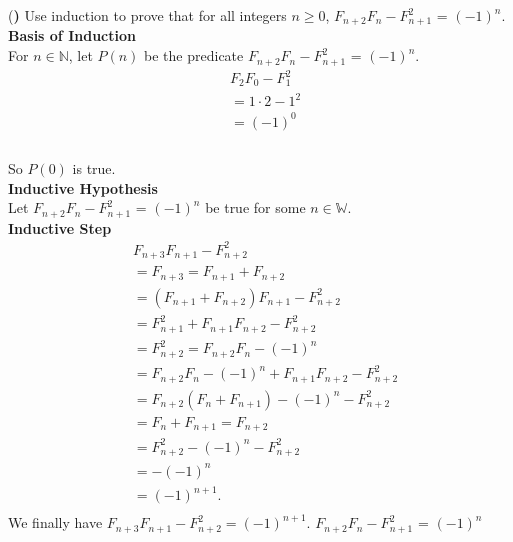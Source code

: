 \documentclass[12pt]{article}
\newcounter{problemnum}
\newcommand{\newprob}{\addtocounter{problemnum}{1} \noindent (\textbf{\arabic{problemnum}) }}
\begin{document}
\newprob Use induction to prove that for all integers $n \geq 0$, $F_{n+2}F_n-F^2_{n+1}$ = $(-1)^n$.\\
\textbf{Basis of Induction}\\
For $n \in \mathbb{N}$, let $P(n)$ be the predicate $F_{n+2}F_n-F^2_{n+1}$ = $(-1)^n$.\\

\begin{align*}
&F_2F_0-F^2_1\\
&=1 \cdot 2-1^2\\
&=(-1)^0\\
\end{align*}\\
So $P(0)$ is true.\\
\textbf{Inductive Hypothesis}\\
Let  $F_{n+2}F_n-F^2_{n+1}$ = $(-1)^n$ be true for some $n \in \mathbb{W}$.\\
\textbf{Inductive Step}\\
\begin{align*}
&F_{n+3}F_{n+1}-F^2_{n+2}\\
&=F_{n+3}=F_{n+1}+F_{n+2}\\
&=(F_{n+1}+F_{n+2})F_{n+1}-F^2_{n+2}\\
&=F^2_{n+1}+F_{n+1}F_{n+2}-F^2_{n+2}\\
&=F^2_{n+2} = F_{n+2}F_n-(-1)^n\\
&=F_{n+2}F_n-(-1)^n+F_{n+1}F_{n+2}-F^2_{n+2}\\
&=F_{n+2}(F_n+F_{n+1})-(-1)^n-F^2_{n+2}\\
&=F_n+F_{n+1}=F_{n+2}\\
&=F^2_{n+2}-(-1)^n-F^2_{n+2}\\
&=-(-1)^n\\
&=(-1)^{n+1}.\\
\end{align*}
We finally have $F_{n+3}F_{n+1}-F^2_{n+2}=(-1)^{n+1}.$
\therefore $F_{n+2}F_n-F^2_{n+1}$ = $(-1)^n$
\end{document}
